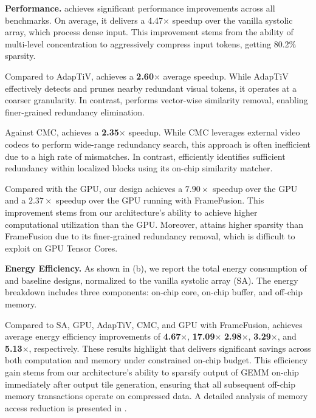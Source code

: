 \textbf{Performance.}  
\proj achieves significant performance improvements across all benchmarks. On average, it delivers a 4.47$\times$ speedup over the vanilla systolic array, which process dense input. This improvement stems from the ability of multi-level concentration to aggressively compress input tokens, getting 80.2\% sparsity. 

Compared to AdapTiV, \proj achieves a \textbf{2.60$\times$} average speedup. While AdapTiV effectively detects and prunes nearby redundant visual tokens, it operates at a coarser granularity. In contrast, \proj performs vector-wise similarity removal, enabling finer-grained redundancy elimination. 

Against CMC, \proj achieves a \textbf{2.35$\times$} speedup. While CMC leverages external video codecs to perform wide-range redundancy search, this approach is often inefficient due to a high rate of mismatches. In contrast, \proj efficiently identifies sufficient redundancy within localized blocks using its on-chip similarity matcher.

{Compared with the GPU, our design achieves a $7.90\times$ speedup over the GPU and a $2.37\times$ speedup over the GPU running with FrameFusion. This improvement stems from our architecture’s ability to achieve higher computational utilization than the GPU. Moreover, \proj attains higher sparsity than FrameFusion due to its finer-grained redundancy removal, which is difficult to exploit on GPU Tensor Cores. 
}

\textbf{Energy Efficiency.}
As shown in (b), we report the total energy consumption of \proj and baseline designs, normalized to the vanilla systolic array (SA). The energy breakdown includes three components: on-chip core, on-chip buffer, and off-chip memory.

Compared to SA, {GPU,} AdapTiV, CMC, and {GPU with FrameFusion}, \proj achieves average energy efficiency improvements of {\textbf{4.67$\times$}}, {\textbf{17.09$\times$}} {\textbf{2.98$\times$}}, {\textbf{3.29$\times$}}, and {\textbf{5.13$\times$}}, respectively. These results highlight that \proj delivers significant savings across both computation and memory under constrained on-chip budget. This efficiency gain stems from our architecture's ability to sparsify output of GEMM on-chip immediately after output tile generation, ensuring that all subsequent off-chip memory transactions operate on compressed data. A detailed analysis of memory access reduction is presented in .


